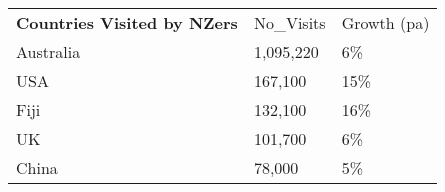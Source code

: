 \begin{tabular}[t]{p{5cm}p{1.3cm}p{1.2cm}}
 \textbf{Countries Visited by NZers} & No\_Visits & Growth (pa) \\ 
 Australia & 1,095,220 & 6\% \\ 
  USA &   167,100 & 15\% \\ 
  Fiji &   132,100 & 16\% \\ 
  UK &   101,700 & 6\% \\ 
  China &    78,000 & 5\% \\ 
  \end{tabular}
